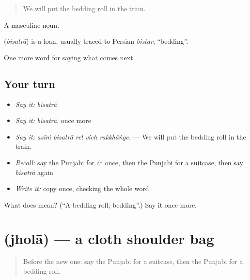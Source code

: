 \begin{quote}
We will put the bedding roll in the train.
\end{quote}

A masculine noun.

\begin{cousinweb}
\textbf{} (\emph{bisatrā}) is a loan, usually traced to Persian \emph{bistar}, \textquotedblleft{}bedding\textquotedblright{}.
\end{cousinweb}

\begin{grammarlens}[title={What you've built}]
One more word for saying what comes next.
\end{grammarlens}

\subsection*{Your turn}
\begin{itemize}
\raggedright
  \item \emph{Say it:} \emph{bisatrā}
  \item \emph{Say it:} \emph{bisatrā}, once more
  \item \emph{Say it:} \emph{asīṁ bisatrā rel vich rakkhāṅge.} — We will put the bedding roll in the train.
  \item \emph{Recall:} say the Punjabi for at once, then the Punjabi for a suitcase, then say \emph{bisatrā} again
  \item \emph{Write it:} copy \textbf{} once, checking the whole word
\end{itemize}

\begin{tcolorbox}[breakable,colback=teal!4,colframe=teal!35!black,title={Before you move on}]
What does  mean? (\textquotedblleft{}A bedding roll; bedding\textquotedblright{}.) Say it once more.
\end{tcolorbox}
\section[\texorpdfstring{\pa{ਝੋਲਾ} (jholā)}{ਝੋਲਾ (jholā)}]{ (jholā) — a cloth shoulder bag}

\label{lesson:PA-C282-jhola}



\begin{quote}
Before the new one: say the Punjabi for a suitcase, then the Punjabi for a bedding roll.
\end{quote}

